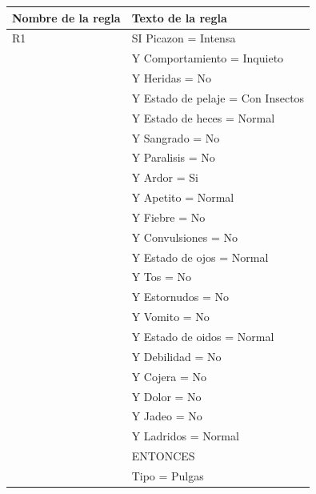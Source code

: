 \documentclass[a4paper,table,xcdraw]{article}
\begin{document}
\begin{table}[H]
\centering
\begin{tabular}{|l|l|}
\hline
\textbf{Nombre de la regla} & Texto de la regla \\ \hline
R1 & SI Picazon = Intensa \\
  & Y Comportamiento = Inquieto \\
  & Y Heridas = No \\
  & Y Estado de pelaje = Con Insectos \\
  & Y Estado de heces = Normal \\
  & Y Sangrado = No \\
  & Y Paralisis = No \\
  & Y Ardor = Si \\
  & Y Apetito = Normal \\
  & Y Fiebre = No \\
  & Y Convulsiones = No \\
  & Y Estado de ojos = Normal \\
  & Y Tos = No \\
  & Y Estornudos = No \\
  & Y Vomito = No \\
  & Y Estado de oidos = Normal \\
  & Y Debilidad = No \\
  & Y Cojera = No \\
  & Y Dolor = No \\
  & Y Jadeo = No \\
  & Y Ladridos = Normal \\
  &   ENTONCES \\
  & Tipo = Pulgas \\ \hline
\end{tabular}
\end{table}
\end{document}
